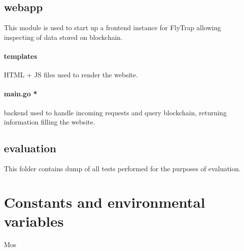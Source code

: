 \subsection{webapp}
This module is used to start up a frontend instance for FlyTrap allowing inspecting of data stored on blockchain.
\paragraph{templates} HTML + JS files used to render the website.
\paragraph{main.go *} backend used to handle incoming requests and query blockchain, returning information filling the website.
\subsection{evaluation}
This folder contains dump of all tests performed for the purposes of evaluation.
\section{Constants and environmental variables}
Mos
